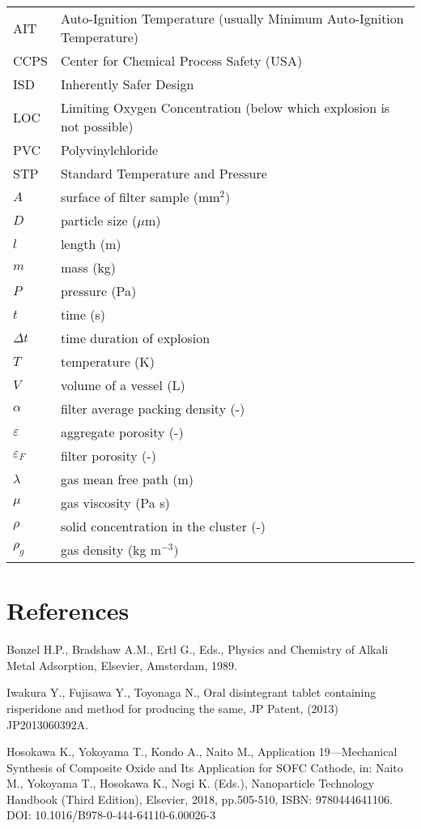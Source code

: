 \documentclass[twocolumn, 10pt]{article}
\begin{document}
\noindent
\begin{tabular}{lp{17em}}
AIT & Auto-Ignition Temperature (usually Minimum Auto-Ignition Temperature) \\
CCPS & Center for Chemical Process Safety (USA) \\
ISD & Inherently Safer Design \\
LOC & Limiting Oxygen Concentration (below which explosion is not possible) \\
PVC & Polyvinylchloride \\
STP & Standard Temperature and Pressure \\
$A$ & surface of filter sample (mm$^{2})$ \\
$D$ & particle size ($\mu$m) \\
$l$ & length (m) \\
$m$ & mass (kg) \\
$P$ & pressure (Pa) \\
$t$ & time (s) \\
$\Delta t$ & time duration of explosion \\
$T$ & temperature (K) \\
$V$ & volume of a vessel (L) \\
$\alpha$ & filter average packing density (-) \\
$\varepsilon$ & aggregate porosity (-)  \\
$\varepsilon_{F}$ & filter porosity (-)  \\
$\lambda$ & gas mean free path (m) \\
$\mu$ & gas viscosity (Pa s) \\
$\rho$ & solid concentration in the cluster (-) \\
$\rho_{g }$ & gas density (kg m$^{-3})$ \\
\end{tabular}


\section*{References }

Bonzel H.P., Bradshaw A.M., Ertl G., Eds., Physics and Chemistry of Alkali Metal Adsorption, Elsevier, Amsterdam, 1989.

Iwakura Y., Fujisawa Y., Toyonaga N., Oral disintegrant tablet containing risperidone and method for producing the same, JP Patent, (2013) 
JP2013060392A.

Hosokawa K., Yokoyama T., Kondo A., Naito M., Application 19---Mechanical Synthesis of Composite Oxide and Its Application for SOFC Cathode, in: Naito M., Yokoyama T., Hosokawa K., Nogi K. (Eds.), Nanoparticle Technology Handbook (Third Edition), Elsevier,  2018, pp.505-510, ISBN: 9780444641106. DOI: 10.1016/B978-0-444-64110-6.00026-3
\end{document}
